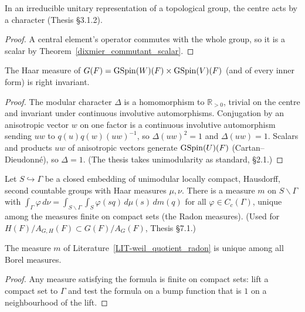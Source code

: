 \begin{theorem}
\label{schur_central}
\leanok
{}
In an irreducible unitary representation of a topological group, the centre acts by a character (Thesis \S3.1.2).
\end{theorem}
\begin{proof}
\leanok
{}
A central element's operator commutes with the whole group, so it is a scalar by Theorem~\ref{dixmier_commutant_scalar}.
\end{proof}

\begin{theorem}[$G(F)$ is unimodular]
\label{isMulRightInvariant_haar_G}
\leanok
{}
The Haar measure of $G(F)=\mathrm{GSpin}(W)(F)\times\mathrm{GSpin}(V)(F)$ (and of every inner form) is right invariant.
\end{theorem}
\begin{proof}
\leanok
{}
The modular character $\Delta$ is a homomorphism to $\mathbb{R}_{>0}$, trivial on the centre and invariant under continuous
involutive automorphisms. Conjugation by an anisotropic vector $w$ on one factor is a continuous involutive automorphism sending $uw$ to
$q(u)q(w)(uw)^{-1}$, so $\Delta(uw)^2=1$ and $\Delta(uw)=1$. Scalars and products $uw$ of anisotropic vectors generate
$\mathrm{GSpin}(U)(F)$ (Cartan--Dieudonn\'e), so $\Delta=1$. (The thesis takes unimodularity as standard, \S2.1.)
\end{proof}

\begin{literature}
\label{LIT-weil_quotient_radon}
\leanok
Let $S\hookrightarrow\Gamma$ be a closed embedding of unimodular locally compact, Hausdorff, second countable
groups with Haar measures $\mu,\nu$. There is a measure $m$ on $S\backslash\Gamma$ with
$\int_\Gamma\varphi\,d\nu=\int_{S\backslash\Gamma}\int_S\varphi(sq)\,d\mu(s)\,dm(q)$ for all
$\varphi\in C_c(\Gamma)$, unique among the measures finite on compact sets (the Radon measures).
(Used for $H(F)/A_{G,H}(F)\subset G(F)/A_G(F)$, Thesis \S7.1.)

\end{literature}

\begin{theorem}
\label{weil_quotient}
\leanok
{}
The measure $m$ of Literature~\ref{LIT-weil_quotient_radon} is unique among all Borel measures.
\end{theorem}
\begin{proof}
\leanok
Any measure satisfying the formula is finite on compact sets: lift a compact set to $\Gamma$ and test the formula
on a bump function that is $1$ on a neighbourhood of the lift.
\end{proof}

